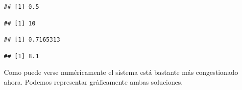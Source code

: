 \documentclass[
]{book}
\newenvironment{Shaded}{\begin{snugshade}}{\end{snugshade}}
\newcommand{\CommentTok}[1]{\textcolor[rgb]{0.56,0.35,0.01}{\textit{#1}}}
\newcommand{\DecValTok}[1]{\textcolor[rgb]{0.00,0.00,0.81}{#1}}
\newcommand{\FunctionTok}[1]{\textcolor[rgb]{0.00,0.00,0.00}{#1}}
\newcommand{\NormalTok}[1]{#1}
\newcommand{\SpecialCharTok}[1]{\textcolor[rgb]{0.00,0.00,0.00}{#1}}
\theoremstyle{definition}
\theoremstyle{definition}
\theoremstyle{definition}
\theoremstyle{definition}
\theoremstyle{remark}
\begin{document}
\begin{verbatim}
## [1] 0.5
\end{verbatim}

\begin{Shaded}
\end{Shaded}

\begin{verbatim}
## [1] 10
\end{verbatim}

\begin{Shaded}
\end{Shaded}

\begin{verbatim}
## [1] 0.7165313
\end{verbatim}

\begin{Shaded}
\end{Shaded}

\begin{verbatim}
## [1] 8.1
\end{verbatim}

Como puede verse numéricamente el sistema está bastante más congestionado ahora. Podemos representar gráficamente ambas soluciones.
\end{document}
